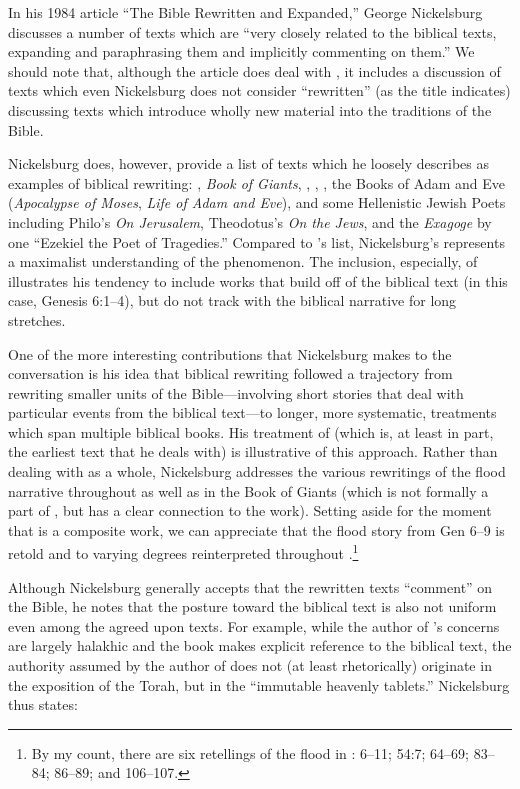 In his 1984 article ``The Bible Rewritten and Expanded,'' George Nickelsburg discusses a number of texts which are ``very closely related to the biblical texts, expanding and paraphrasing them and implicitly commenting on them.''\autocite[89]{nickelsburg_stone1984} We should note that, although the article does deal with \rwb, it includes a discussion of texts which even Nickelsburg does not consider ``rewritten'' (as the title indicates) discussing texts which introduce wholly new material into the traditions of the Bible. \autocite[89--90]{nickelsburg_stone1984}

Nickelsburg does, however, provide a list of texts which he loosely describes as examples of biblical rewriting: \firstenoch, \emph{Book of Giants}, \jub, \ga, \ant, the Books of Adam and Eve (\emph{Apocalypse of Moses}, \emph{Life of Adam and Eve}), and some Hellenistic Jewish Poets including Philo's \emph{On Jerusalem}, Theodotus's \emph{On the Jews}, and the \emph{Exagoge} by one ``Ezekiel the Poet of Tragedies.'' Compared to \vermes's list, Nickelsburg's represents a maximalist understanding of the \rwb phenomenon. The inclusion, especially, of \firstenoch illustrates his tendency to include works that build off of the biblical text (in this case, Genesis 6:1--4), but do not track with the biblical narrative for long stretches. 

One of the more interesting contributions that Nickelsburg makes to the conversation is his idea that biblical rewriting followed a trajectory from rewriting smaller units of the Bible---involving short stories that deal with particular events from the biblical text---to longer, more systematic, treatments which span multiple biblical books. His treatment of \firstenoch (which is, at least in part, the earliest text that he deals with) is illustrative of this approach. Rather than dealing with \firstenoch as a whole, Nickelsburg addresses the various rewritings of the flood narrative throughout \firstenoch as well as in the Book of Giants (which is not formally a part of \firstenoch, but has a clear connection to the work). Setting aside for the moment that \firstenoch is a composite work, we can appreciate that the flood story from Gen 6--9 is retold and to varying degrees reinterpreted throughout \firstenoch.\footnote{By my count, there   are six retellings of the flood in \firstenoch: 6--11; 54:7; 64--69;   83--84; 86--89; and 106--107.} 

Although Nickelsburg generally accepts that the rewritten texts ``comment'' on the Bible, he notes that the posture toward the biblical text is also not uniform even among the agreed upon \rwb texts. For example, while the author of \jub's concerns are largely halakhic and the book makes explicit reference to the biblical text, the authority assumed by the author of \jub does not (at least rhetorically) originate in the exposition of the Torah, but in the ``immutable heavenly tablets.''\autocite[100--101]{nickelsburg_stone1984} Nickelsburg thus states: 

